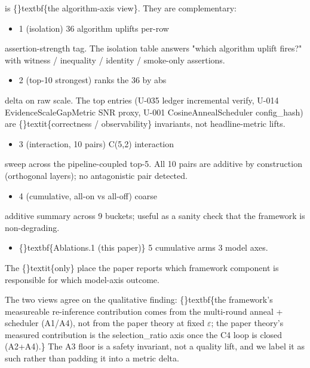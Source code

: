 \documentclass{article}
\begin{document}
 is \{\}textbf\{the algorithm-axis view\}. They are complementary:

\begin{itemize}
\item {} 1 (isolation)  36 algorithm uplifts  per-row
\end{itemize}
  assertion-strength tag. The isolation table answers "which algorithm uplift fires?" with witness / inequality / identity / smoke-only assertions.

\begin{itemize}
\item {} 2 (top-10 strongest)  ranks the 36 by abs
\end{itemize}
delta on raw scale. The top entries (U-035 ledger incremental verify, U-014 EvidenceScaleGapMetric SNR proxy, U-001 CosineAnnealScheduler config\_hash) are \{\}textit\{correctness / observability\} invariants, not headline-metric lifts.

\begin{itemize}
\item {} 3 (interaction, 10 pairs)  C(5,2) interaction
\end{itemize}
sweep across the pipeline-coupled top-5. All 10 pairs are additive by construction (orthogonal layers); no antagonistic pair detected.

\begin{itemize}
\item {} 4 (cumulative, all-on vs all-off)  coarse
\end{itemize}
additive summary across 9 buckets; useful as a sanity check that the framework is non-degrading.

\begin{itemize}
\item \{\}textbf\{Ablations.1 (this paper)\}  5 cumulative arms  3 model axes.
\end{itemize}
The \{\}textit\{only\} place the paper reports which framework component is responsible for which model-axis outcome.

The two views agree on the qualitative finding: \{\}textbf\{the framework's measureable re-inference contribution comes from the multi-round anneal + scheduler (A1/A4), not from the paper theory at fixed $\varepsilon$; the paper theory's measured contribution is the selection\_ratio axis once the C4 loop is closed (A2+A4).\} The A3 floor is a safety invariant, not a quality lift, and we label it as such rather than padding it into a metric delta.
\end{document}
